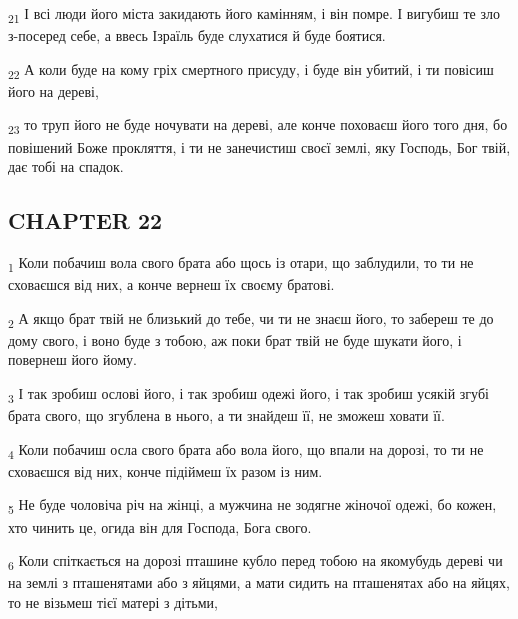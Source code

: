 \begin{tcolorbox}
\textsubscript{21} І всі люди його міста закидають його камінням, і він помре. І вигубиш те зло з-посеред себе, а ввесь Ізраїль буде слухатися й буде боятися.
\end{tcolorbox}
\begin{tcolorbox}
\textsubscript{22} А коли буде на кому гріх смертного присуду, і буде він убитий, і ти повісиш його на дереві,
\end{tcolorbox}
\begin{tcolorbox}
\textsubscript{23} то труп його не буде ночувати на дереві, але конче поховаєш його того дня, бо повішений Боже прокляття, і ти не занечистиш своєї землі, яку Господь, Бог твій, дає тобі на спадок.
\end{tcolorbox}
\subsection{CHAPTER 22}
\begin{tcolorbox}
\textsubscript{1} Коли побачиш вола свого брата або щось із отари, що заблудили, то ти не сховаєшся від них, а конче вернеш їх своєму братові.
\end{tcolorbox}
\begin{tcolorbox}
\textsubscript{2} А якщо брат твій не близький до тебе, чи ти не знаєш його, то забереш те до дому свого, і воно буде з тобою, аж поки брат твій не буде шукати його, і повернеш його йому.
\end{tcolorbox}
\begin{tcolorbox}
\textsubscript{3} І так зробиш ослові його, і так зробиш одежі його, і так зробиш усякій згубі брата свого, що згублена в нього, а ти знайдеш її, не зможеш ховати її.
\end{tcolorbox}
\begin{tcolorbox}
\textsubscript{4} Коли побачиш осла свого брата або вола його, що впали на дорозі, то ти не сховаєшся від них, конче підіймеш їх разом із ним.
\end{tcolorbox}
\begin{tcolorbox}
\textsubscript{5} Не буде чоловіча річ на жінці, а мужчина не зодягне жіночої одежі, бо кожен, хто чинить це, огида він для Господа, Бога свого.
\end{tcolorbox}
\begin{tcolorbox}
\textsubscript{6} Коли спіткається на дорозі пташине кубло перед тобою на якомубудь дереві чи на землі з пташенятами або з яйцями, а мати сидить на пташенятах або на яйцях, то не візьмеш тієї матері з дітьми,
\end{tcolorbox}

